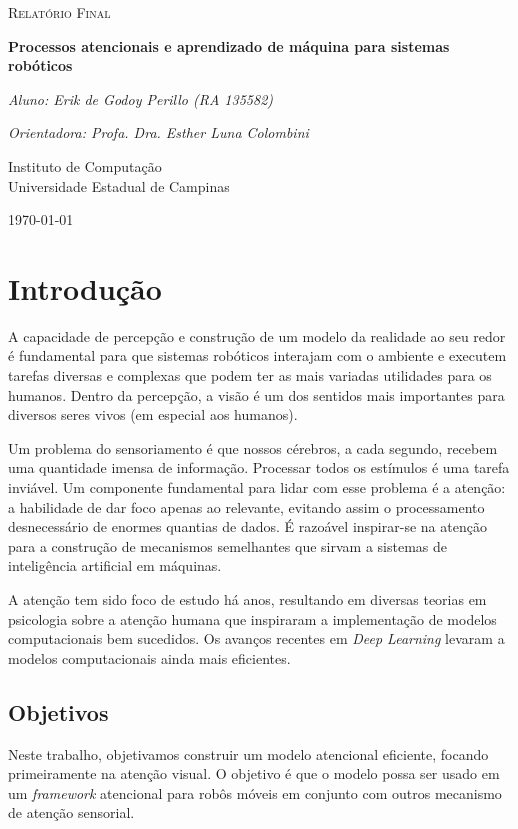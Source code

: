 \documentclass[11pt]{article}
\newcommand{\tit}[1]{\textit{#1}}
\begin{document}

\begin{titlepage}
	\centering
	{\scshape\Large Relatório Final\par}
	\vspace{1.5cm}
	{\huge\bfseries Processos atencionais e aprendizado de máquina
		para sistemas robóticos\par}
	\vspace{1cm}
    {\itshape Aluno: Erik de Godoy Perillo (RA 135582)\par}
	{\itshape Orientadora: Profa. Dra. Esther Luna Colombini\par}
	\vspace{0.5cm}
	\vfill
    Instituto de Computação\\
	Universidade Estadual de Campinas
	\vfill
	{\large \today\par}
\end{titlepage}

\newpage

\section{Introdução}
A capacidade de percepção e construção de um modelo da realidade ao seu redor
é fundamental para que sistemas robóticos interajam com o ambiente e executem
tarefas diversas e complexas que podem ter as mais variadas utilidades para
os humanos.
Dentro da percepção, a visão é um dos sentidos mais importantes para diversos
seres vivos (em especial aos humanos).

Um problema do sensoriamento é que nossos cérebros,
a cada segundo, recebem uma quantidade imensa de informação.
Processar todos os estímulos é uma tarefa inviável.
Um componente fundamental para lidar com esse problema é a atenção: a
habilidade de dar
foco apenas ao relevante, evitando assim o processamento desnecessário de
enormes quantias de dados.
É razoável inspirar-se na atenção para a construção de
mecanismos semelhantes que sirvam a sistemas de inteligência
artificial em máquinas.

A atenção tem sido foco de estudo há anos, resultando em diversas teorias
em psicologia sobre a atenção humana que inspiraram a implementação de
modelos computacionais bem sucedidos.
Os avanços recentes em \tit{Deep Learning} levaram a modelos computacionais
ainda mais eficientes.

\subsection{Objetivos}
Neste trabalho, objetivamos construir um modelo atencional eficiente, focando
primeiramente na atenção visual.
O objetivo é que o modelo possa ser usado em um \tit{framework} atencional
para robôs móveis em conjunto com outros mecanismo de atenção sensorial.
\end{document}
